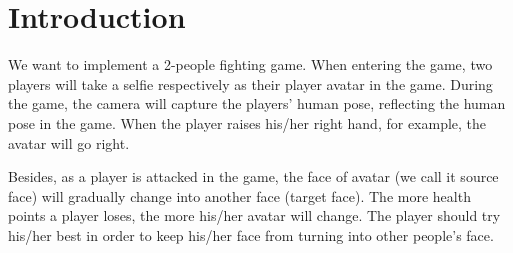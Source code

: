 \section{Introduction}
We want to implement a 2-people fighting game. When entering the game, two players will take a selfie respectively as their player avatar in the game. During the game, the camera will capture the players' human pose, reflecting the human pose in the game. When the player raises his/her right hand, for example, the avatar will go right.

Besides, as a player is attacked in the game, the face of avatar (we call it source face) will gradually change into another face (target face). The more health points a player loses, the more his/her avatar will change. The player should try his/her best in order to keep his/her face from turning into other people's face.